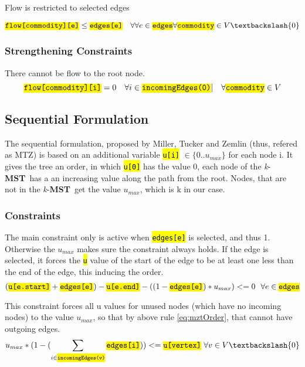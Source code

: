 \documentclass[,%
			paper=a4,%
			DIV14,
			liststotoc,
			bibtotoc,
			draft=false,%
			numbers=noendperiod
			]{scrartcl}
\newcommand{\mst}{\textbf{MST}}
\newcommand{\kmst}{\textit{k}-\mst}
\newcommand{\ilc}[1]{\hl{\texttt{#1}}} %
\begin{document}
Flow is restricted to selected edges

\begin{equation}\label{eq:mfcFlowEdge}
 \ilc{flow[commodity][e]} \leq \ilc{edges[e]} \quad \forall \forall e \in \ilc{edges}
\forall \ilc{commodity} \in V  \textbackslash \{0\}
\end{equation}

\subsubsection{Strengthening Constraints}

There cannot be flow to the root node.
\begin{equation}\label{eq:mfcNoFlow}
 \ilc{flow[commodity][i]} = 0
\quad \forall i \in \ilc{incomingEdges(0)} | 
\quad \forall \ilc{commodity} \in V
\end{equation}


\subsection{Sequential Formulation}
The sequential formulation, proposed by Miller, Tucker and Zemlin (thus, refered as MTZ) is  based on an additional variable \ilc{u[i]} $\in \{0..u_{max}\}$ for each node i. It gives the tree an order, in which \ilc{u[0]} has the value 0, each node of the \kmst\ has a an increasing value along the path from the root. Nodes, that are not in the \kmst\ get the value $u_{max}$, which is k in our case.

\subsubsection{Constraints}
The main constraint only is active when \ilc{edges[e]} is selected, and thus 1. Otherwise the $u_{max}$ makes sure the constraint always holds. If the edge is selected, it forces the \ilc{u} value of the start of the edge to be at least one less than the end of the edge, this inducing the order.
\begin{equation}\label{eq:mztOrder}
 (\ilc{u[e.start]} + \ilc{edges[e]})  - \ilc{u[e.end]} - ( ( 1 - \ilc{edges[e]}) * u_{max} )  <= 0
\ \ \forall e \in \ilc{edges}
\end{equation}

This constraint forces all u values for unused nodes (which have no incoming nodes) to the value $u_{max}$, so that by above rule \eqref{eq:mztOrder}, that cannot have outgoing edges.
\begin{equation}\label{eq:mztUnused}
 u_{max}*(1 - (\sum_{ i \in \ilc{incomingEdges(v)}} \ilc{edges[i]} )) <= \ilc{u[vertex]}
 \ \forall v \in V  \textbackslash \{0\}
\end{equation}
\end{document}

